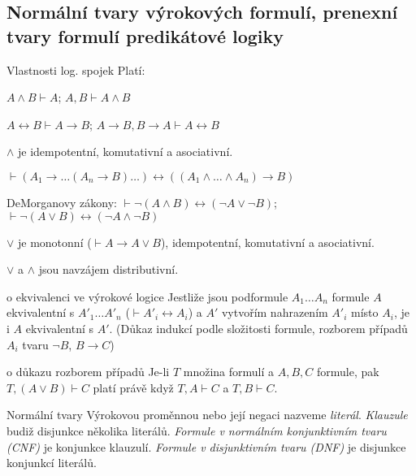 \subsection{Normální tvary výrokových formulí, prenexní tvary formulí predikátové logiky}

\begin{poznamkaN}{Vlastnosti log. spojek}
Platí:
\begin{penumerate}
    \item $A\wedge B\vdash A$; $A,B\vdash A\wedge B$
    \item $A\leftrightarrow B\vdash A\rightarrow B$; $A\rightarrow B, B\rightarrow A\vdash A\leftrightarrow B$
    \item $\wedge$ je idempotentní, komutativní a asociativní.
    \item $\vdash(A_1\rightarrow\dots(A_n\rightarrow B)\dots)
	\leftrightarrow((A_1\wedge\dots\wedge A_n)\rightarrow B)$
    \item DeMorganovy zákony: $\vdash\neg(A\wedge B)\leftrightarrow(\neg A\vee\neg B)$;
	$\vdash\neg(A\vee B)\leftrightarrow(\neg A\wedge\neg B)$
    \item $\vee$ je monotonní ($\vdash A\rightarrow A\vee B$), idempotentní, komutativní a asociativní.
    \item $\vee$ a $\wedge$ jsou navzájem distributivní.
\end{penumerate}
\end{poznamkaN}

\begin{vetaN}{o ekvivalenci ve výrokové logice}
Jestliže jsou podformule $A_1\dots A_n$ formule $A$ ekvivalentní s $A'_1\dots A'_n$ ($\vdash A'_i \leftrightarrow A_i$) a $A'$ vytvořím nahrazením $A'_i$ místo $A_i$, je i $A$ ekvivalentní s $A'$. (Důkaz indukcí podle složitosti formule, rozborem případů $A_i$ tvaru $\neg B$, $B\rightarrow C$)
\end{vetaN}

\begin{lemmaN}{o důkazu rozborem případů}
Je-li $T$ množina formulí a $A,B,C$ formule, pak $T,(A\vee B)\vdash C$ platí právě když $T,A\vdash C$ a $T,B\vdash C$.
\end{lemmaN}

\begin{definiceN}{Normální tvary}
Výrokovou proměnnou nebo její negaci nazveme \emph{literál}. \emph{Klauzule} budiž disjunkce několika literálů. \emph{Formule v normálním konjunktivním tvaru (CNF)} je konjunkce klauzulí. \emph{Formule v disjunktivním tvaru (DNF)} je disjunkce konjunkcí literálů.
\end{definiceN}

